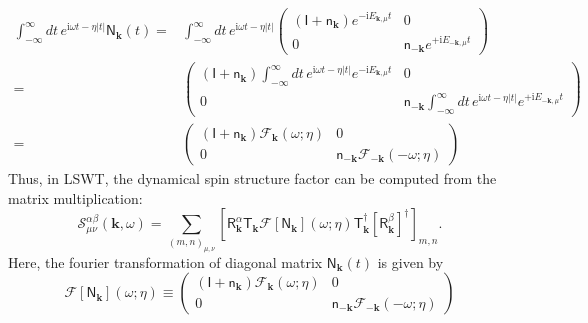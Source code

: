 \documentclass[aps, prx, nofootinbib, superscriptaddress]{revtex4-2}
\newcommand{\kvec}{\mathbf{k}}
\newcommand{\ri}{\mathrm{i}}
\begin{document}
\begin{equation}
    \begin{split}
        \int_{-\infty}^{\infty} dt \, e^{\ri \omega t - \eta |t|} \mathsf{N}_{\kvec} (t) 
        = &
        \int_{-\infty}^{\infty} dt \, e^{\ri \omega t  - \eta |t|}
        \begin{pmatrix}
            ( \mathsf{I} + \mathsf{n}_{\kvec} ) e^{-\ri E_{\kvec,\mu}t}  & 0 \\
            0                         & \mathsf{n}_{-\kvec}  e^{+\ri E_{-\kvec,\mu}t}
        \end{pmatrix} \\
        = &
        \begin{pmatrix}
            ( \mathsf{I} + \mathsf{n}_{\kvec} ) 
            \int_{-\infty}^{\infty} dt \, e^{\ri \omega t  - \eta |t|} 
            e^{-\ri E_{\kvec,\mu}t}  & 0 \\
            0                         & \mathsf{n}_{-\kvec}
            \int_{-\infty}^{\infty} dt \, e^{\ri \omega t  - \eta |t|}  e^{+\ri E_{-\kvec,\mu}t}
        \end{pmatrix} \\
        = & 
        \begin{pmatrix}
            ( \mathsf{I} + \mathsf{n}_{\kvec} ) \mathcal{F}_{\kvec} (\omega; \eta)  & 0 \\
            0   &   \mathsf{n}_{-\kvec} \mathcal{F}_{- \kvec} (-\omega; \eta)
        \end{pmatrix} 
    \end{split}
\end{equation}
Thus, in LSWT, the dynamical spin structure factor can be computed from the matrix multiplication:
\begin{equation}
    \mathcal{S}^{\alpha\beta}_{\mu\nu} (\kvec, \omega)
    =
    \sum_{(m,n)_{\mu,\nu}} 
    \left[  \mathsf{R}^{\alpha}_{\kvec} \mathsf{T}_{\kvec}
    \mathcal{F} [\mathsf{N}_{\kvec}](\omega; \eta)
    \mathsf{T}_{\kvec}^{\dagger} [\mathsf{R}^{\beta}_{\kvec}]^{\dagger} \right]_{m,n}.
\end{equation}
Here, the fourier transformation of diagonal matrix $\mathsf{N}_{\kvec} (t)$ is given by
\begin{equation}
    \mathcal{F} [\mathsf{N}_{\kvec}](\omega; \eta)
    \equiv 
    \begin{pmatrix}
        ( \mathsf{I} + \mathsf{n}_{\kvec} )    \mathcal{F}_{ \kvec} (  \omega; \eta  )  & 0 \\
        0   &   \mathsf{n}_{-\kvec} \mathcal{F}_{-\kvec} ( -\omega; \eta  )
    \end{pmatrix} 
\end{equation}
\end{document}

